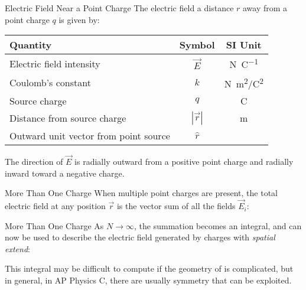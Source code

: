 \documentclass[12pt,aspectratio=169]{beamer}
\begin{document}
\begin{frame}{Electric Field Near a Point Charge}
  The electric field a distance $r$ away from a point charge $q$ is given by:

  \begin{center}
    \begin{tabular}{l|c|c}
      \rowcolor{pink}
      \textbf{Quantity} & \textbf{Symbol} & \textbf{SI Unit} \\ \hline
      Electric field intensity    & $\vec E$ & \si{\newton\per\coulomb}\\
      Coulomb's constant          & $k$   & \si{N.m^2/C^2} \\
      Source charge               & $q$   & \si\coulomb \\
      Distance from source charge & $|\vec r|$   & \si\metre \\
      Outward unit vector from point source & $\hat r$ &
    \end{tabular}
  \end{center}
  The direction of $\vec E$ is radially outward from a positive point charge
  and radially inward toward a negative charge.
\end{frame}



\begin{frame}{More Than One Charge}
  When multiple point charges are present, the total electric field at any
  position $\vec r$ is the vector sum of all the fields $\vec E_i$:
    
\end{frame}



\begin{frame}{More Than One Charge}
  As $N\rightarrow\infty$, the summation becomes an integral, and can now be
  used to describe the electric field generated by charges with
  \emph{spatial extend}:

  
  This integral may be difficult to compute if the geometry of is complicated,
  but in general, in AP Physics C, there are usually symmetry that can be
  exploited.
\end{frame}
\end{document}
